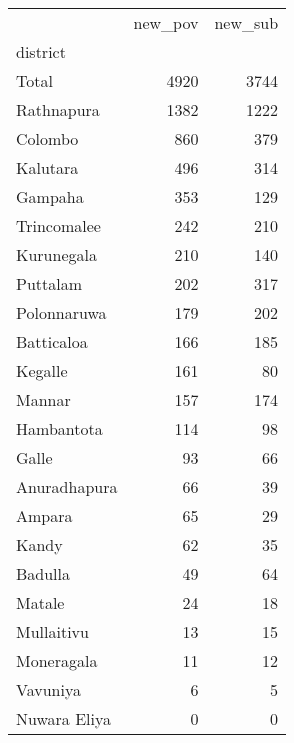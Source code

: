 \begin{tabular}{lrr}
\toprule
{} &  new\_pov &  new\_sub \\
district     &          &          \\
\midrule
Total        &     4920 &     3744 \\
Rathnapura   &     1382 &     1222 \\
Colombo      &      860 &      379 \\
Kalutara     &      496 &      314 \\
Gampaha      &      353 &      129 \\
Trincomalee  &      242 &      210 \\
Kurunegala   &      210 &      140 \\
Puttalam     &      202 &      317 \\
Polonnaruwa  &      179 &      202 \\
Batticaloa   &      166 &      185 \\
Kegalle      &      161 &       80 \\
Mannar       &      157 &      174 \\
Hambantota   &      114 &       98 \\
Galle        &       93 &       66 \\
Anuradhapura &       66 &       39 \\
Ampara       &       65 &       29 \\
Kandy        &       62 &       35 \\
Badulla      &       49 &       64 \\
Matale       &       24 &       18 \\
Mullaitivu   &       13 &       15 \\
Moneragala   &       11 &       12 \\
Vavuniya     &        6 &        5 \\
Nuwara Eliya &        0 &        0 \\
\bottomrule
\end{tabular}
